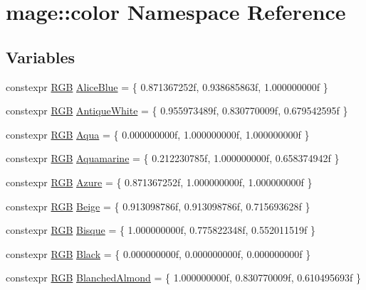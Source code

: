 \hypertarget{namespacemage_1_1color}{}\section{mage\+:\+:color Namespace Reference}
\label{namespacemage_1_1color}
\subsection*{Variables}
\begin{DoxyCompactItemize}
\item 
constexpr \hyperlink{structmage_1_1_r_g_b}{R\+GB} \hyperlink{namespacemage_1_1color_abd4f16c016b0f4447d08269b0ffb1332}{Alice\+Blue} = \{ 0.\+871367252f, 0.\+938685863f, 1.\+000000000f \}
\item 
constexpr \hyperlink{structmage_1_1_r_g_b}{R\+GB} \hyperlink{namespacemage_1_1color_a66ba58abef7d938d58b25b45ebfec98f}{Antique\+White} = \{ 0.\+955973489f, 0.\+830770009f, 0.\+679542595f \}
\item 
constexpr \hyperlink{structmage_1_1_r_g_b}{R\+GB} \hyperlink{namespacemage_1_1color_a1c3b68d6209b49526a3ba6d27f4958d9}{Aqua} = \{ 0.\+000000000f, 1.\+000000000f, 1.\+000000000f \}
\item 
constexpr \hyperlink{structmage_1_1_r_g_b}{R\+GB} \hyperlink{namespacemage_1_1color_aeb7c11e0c59678c6ddcc4e8379c5a951}{Aquamarine} = \{ 0.\+212230785f, 1.\+000000000f, 0.\+658374942f \}
\item 
constexpr \hyperlink{structmage_1_1_r_g_b}{R\+GB} \hyperlink{namespacemage_1_1color_a002c51cadb3b21c6a0c3492303207ee3}{Azure} = \{ 0.\+871367252f, 1.\+000000000f, 1.\+000000000f \}
\item 
constexpr \hyperlink{structmage_1_1_r_g_b}{R\+GB} \hyperlink{namespacemage_1_1color_a26bfb42ab556acd93a90a8c16f0d6c28}{Beige} = \{ 0.\+913098786f, 0.\+913098786f, 0.\+715693628f \}
\item 
constexpr \hyperlink{structmage_1_1_r_g_b}{R\+GB} \hyperlink{namespacemage_1_1color_a475426fc358c0aa9f4e222003a273a1d}{Bisque} = \{ 1.\+000000000f, 0.\+775822348f, 0.\+552011519f \}
\item 
constexpr \hyperlink{structmage_1_1_r_g_b}{R\+GB} \hyperlink{namespacemage_1_1color_a1395fb0c23b604e389b2d81fd0670bdc}{Black} = \{ 0.\+000000000f, 0.\+000000000f, 0.\+000000000f \}
\item 
constexpr \hyperlink{structmage_1_1_r_g_b}{R\+GB} \hyperlink{namespacemage_1_1color_a1ffaefe9ca0592fa48fa321b694fd489}{Blanched\+Almond} = \{ 1.\+000000000f, 0.\+830770009f, 0.\+610495693f \}

\end{DoxyCompactItemize}
